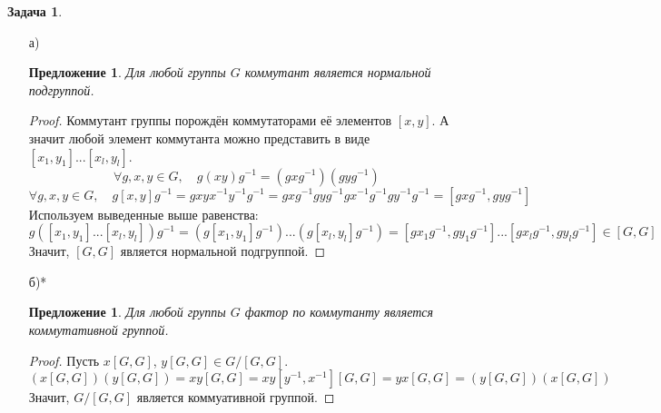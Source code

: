\documentclass[12pt]{article}
\newtheorem{predl}[theorem]{Предложение}
\theoremstyle{definition}
\newtheorem{zad}{Задача}[section]
\begin{document}
\begin{zad}
\begin{itemize}
    \item[а)]
    \begin{predl}
        Для любой группы $G$ коммутант является нормальной подгруппой.
    \end{predl}
    \begin{proof}
        Коммутант группы порождён коммутаторами её элементов $[x,y]$. А значит любой элемент коммутанта можно представить в виде $[x_1,y_1]...[x_l,y_l]$.
        \begin{equation}
            \forall g,x,y\in G,\quad g(xy)g^{-1}=(gxg^{-1})(gyg^{-1})
        \end{equation}
        \begin{equation*}
            \forall g,x,y\in G,\quad g[x,y]g^{-1}=gxyx^{-1}y^{-1}g^{-1}=gxg^{-1}gyg^{-1}gx^{-1}g^{-1}gy^{-1}g^{-1}=[gxg^{-1},gyg^{-1}]
        \end{equation*}
        Используем выведенные выше равенства:
        \begin{equation*}
            g([x_1,y_1]...[x_l,y_l])g^{-1}=(g[x_1,y_1]g^{-1})...(g[x_l,y_l]g^{-1})=[gx_1g^{-1},gy_1g^{-1}]...[gx_lg^{-1},gy_lg^{-1}]\in[G,G]
        \end{equation*}
        Значит, $[G,G]$ является нормальной подгруппой.
    \end{proof}
    \item[б)*]
    \begin{predl}
        Для любой группы $G$ фактор по коммутанту является коммутативной группой.
    \end{predl}
    \begin{proof}
        Пусть $x[G,G]$, $y[G,G] \in G/[G,G]$.
        \begin{equation}
            (x[G,G])(y[G,G])=xy[G,G]=xy[y^{-1},x^{-1}][G,G]=yx[G,G]=(y[G,G])(x[G,G])
        \end{equation}
        Значит, $G/[G,G]$ является коммуативной группой.
    \end{proof}
\end{itemize}
\end{zad}
\end{document}
